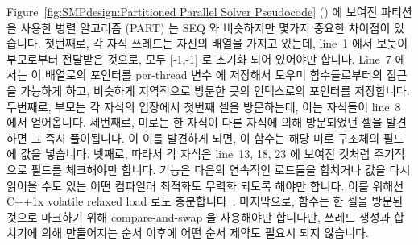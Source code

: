 Figure~\ref{fig:SMPdesign:Partitioned Parallel Solver Pseudocode}
() 에 보여진 파티션을 사용한 병렬 알고리즘 (PART) 는 SEQ 와
비슷하지만 몇가지 중요한 차이점이 있습니다.
첫번째로, 각 자식 쓰레드는 자신의  배열을 가지고 있는데, line~1
에서 보듯이 부모로부터 전달받은 것으로, 모두 [-1,-1] 로 초기화 되어 있어야만
합니다.
Line~7 에서는 이 배열로의 포인터를 per-thread 변수  에 저장해서
도우미 함수들로부터의 접근을 가능하게 하고, 비슷하게 지역적으로 방문한 곳의
인덱스로의 포인터를 저장합니다.
두번째로, 부모는 각 자식의 입장에서 첫번째 셀을 방문하는데, 이는 자식들이
line~8 에서 얻어옵니다.
세번째로, 미로는 한 자식이 다른 자식에 의해 방문되었던 셀을 발견하면 그 즉시
풀이됩니다.
 이 이를 발견하게 되면, 이 함수는 해당 미로 구조체의
 필드에 값을 넣습니다.
넷째로, 따라서 각 자식은 line~13, 18, 23 에 보여진 것처럼 주기적으로
 필드를 체크해야만 합니다.
 기능은 다음의 연속적인 로드들을 합치거나 값을 다시 읽어올
수도 있는 어떤 컴파일러 최적화도 무력화 되도록 해야만 합니다.
이를 위해선 C++1x volatile relaxed load 로도
충분합니다~\cite{PeteBecker2011N3242}.
마지막으로,  함수는 한 셀을 방문된 것으로
마크하기 위해 compare-and-swap 을 사용해야만 합니다만, 쓰레드 생성과 합치기에
의해 만들어지는 순서 이후에 어떤 순서 제약도 필요시 되지 않습니다.

